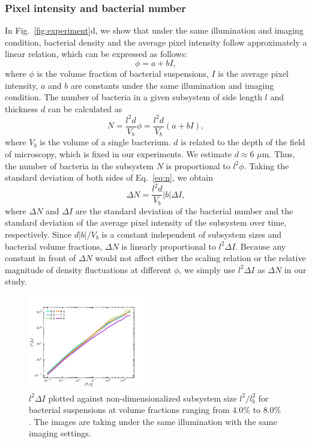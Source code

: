 \documentclass[twocolumn,aps,prx,amsmath,amssymb,longbibliography]{revtex4-2}
\begin{document}
\subsubsection{Pixel intensity and bacterial number}
In Fig.~\ref{fig:experiment}d, we show that under the same illumination and imaging condition, bacterial density and the average pixel intensity follow approximately a linear relation, which can be expressed as follows:
\begin{equation}
\label{eq:phi-I-relation}
\phi = a + bI,
\end{equation}
where $\phi$ is the volume fraction of bacterial suspensions, $I$ is the average pixel intensity, $a$ and $b$ are constants under the same illumination and imaging condition. The number of bacteria in a given subsystem of side length $l$ and thickness $d$ can be calculated as
\begin{equation}
\label{eq:n}
N = \frac{l^2d}{V_b} \phi = \frac{l^2d}{V_b} (a+bI),
\end{equation}
where $V_b$ is the volume of a single bacterium. $d$ is related to the depth of the field of microscopy, which is fixed in our experiments. We estimate $d \approx 6$ $\mu$m. Thus, the number of bacteria in the subsystem $N$ is proportional to $l^2 \phi$. Taking the standard deviation of both sides of Eq.~\ref{eq:n}, we obtain
\begin{equation}
\label{intensity-number}
\Delta N = \frac{l^2 d}{V_b}|b|\Delta I,
\end{equation}
where $\Delta N$ and $\Delta I$ are the standard deviation of the bacterial number and the standard deviation of the average pixel intensity of the subsystem over time, respectively. Since $d|b|/V_b$ is a constant independent of subsystem sizes and bacterial volume fractions, $\Delta N$ is linearly proportional to $l^2\Delta I$. Because any constant in front of $\Delta N$ would not affect either the scaling relation or the relative magnitude of density fluctuations at different $\phi$, we simply use $l^2\Delta I$ as $\Delta N$ in our study.


\begin{figure}[t]
	\begin{center}
		\includegraphics[width=0.46\textwidth]{Figures/fig-8.pdf}
		\caption[Density autocorrelation]
		{
      $l^2\Delta I$ plotted against non-dimensionalized subsystem size $l^2/l_b^2$ for bacterial suspensions at volume fractions ranging from $4.0\%$ to $8.0\%$. The images are taking under the same illumination with the same imaging settings.
		}
		\label{fig:same-conditions}
	\end{center}
\end{figure}
\end{document}
